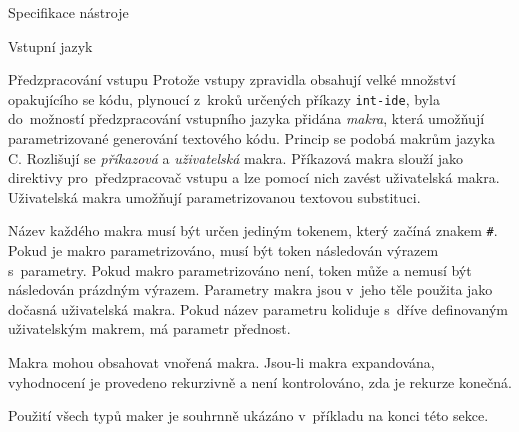 \documentclass[thesis=M,czech]{FITthesis}[2012/06/26]
\newcommand{\id}[1]{\texttt{#1}}
\newcommand{\hl}[1]{\textit{#1}}
\newcommand{\name}[1]{\hl{#1}}
\begin{document}
\begin{section}{Specifikace nástroje}
\begin{subsection}{Vstupní jazyk}
\begin{subsubsection}{Předzpracování vstupu}
Protože vstupy zpravidla obsahují velké množství opakujícího se kódu,
plynoucí z~kroků určených příkazy \id{int\--ide},
byla do~možností předzpracování vstupního jazyka přidána \name{makra},
která umožňují parametrizované generování textového kódu.
Princip se podobá makrům jazyka C.
Rozlišují se \hl{příkazová} a \hl{uživatelská} makra.
Příkazová makra slouží jako direktivy pro~předzpracovač vstupu
a lze pomocí nich zavést uživatelská makra.
Uživatelská makra umožňují parametrizovanou textovou substituci.

Název každého makra musí být určen jediným tokenem,
který začíná znakem \id{\#}.
Pokud je makro parametrizováno,
musí být token následován výrazem s~parametry.
Pokud makro parametrizováno není,
token může a nemusí být následován prázdným výrazem.
Parametry makra jsou v~jeho těle použita
jako dočasná uživatelská makra. Pokud název parametru
koliduje s~dříve definovaným uživatelským makrem,
má parametr přednost.

Makra mohou obsahovat vnořená makra.
Jsou-li makra expandována, vyhodnocení je provedeno rekurzivně
a není kontrolováno, zda je rekurze konečná.

Použití všech typů maker je souhrnně ukázáno
v~příkladu na konci této sekce.



\end{subsubsection}
\end{subsection}
\end{section}
\end{document}
